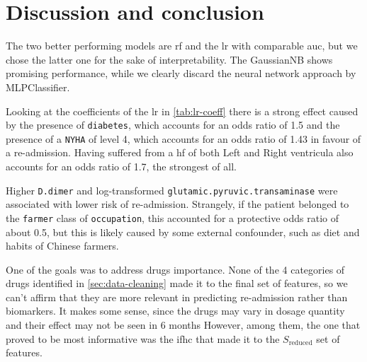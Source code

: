 \section{Discussion and conclusion}

The two better performing models are \gls{rf} and the \gls{lr} with comparable \gls{auc}, but we chose the latter one for the sake of interpretability. The GaussianNB shows promising performance, while we clearly discard the neural network approach by MLPClassifier.

Looking at the coefficients of the \gls{lr} in \autoref{tab:lr-coeff} there is a strong effect caused by the presence of \texttt{diabetes}, which accounts for an odds ratio of 1.5 and the presence of a \texttt{NYHA} of level 4, which accounts for an odds ratio of 1.43 in favour of a re-admission. Having suffered from a \gls{hf} of both Left and Right ventricula also accounts for an odds ratio of 1.7, the strongest of all.

Higher \texttt{D.dimer} and log-transformed \texttt{glutamic.pyruvic.transaminase} were associated with lower risk of re-admission. Strangely, if the patient belonged to the \texttt{farmer} class of \texttt{occupation}, this accounted for a protective odds ratio of about 0.5, but this is likely caused by some external confounder, such as diet and habits of Chinese farmers.

One of the goals was to address drugs importance. None of the 4 categories of drugs identified in \autoref{sec:data-cleaning} made it to the final set of features, so we can't affirm that they are more relevant in predicting re-admission rather than biomarkers. It makes some sense, since the drugs may vary in dosage quantity and their effect may not be seen in 6 months
However, among them, the one that proved to be most informative was the \gls{ifhc} that made it to the $S_{\text{reduced}}$ set of features.




